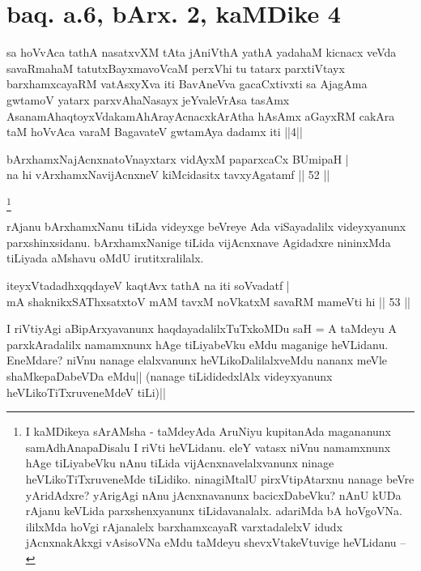 \section*{baq. a.6, bArx. 2, kaMDike 4}

\begin{shl}
sa hoVvAca tathA nasatxvXM tAta jAniVthA yathA yadahaM kicnacx veVda savaRmahaM tatutxBayxmavoVcaM perxVhi tu tatarx parxtiVtayx barxhamxcayaRM vatAsxyXva iti BavAneVva gacaCxtivxti sa AjagAma gwtamoV yatarx parxvAhaNasayx jeYvaleVrAsa tasAmx AsanamAhaqtoyxVdakamAhArayAcnacxkArAtha hAsAmx aGayxRM cakAra taM hoVvAca varaM BagavateV gwtamAya dadamx iti ||4||
\end{shl}

\begin{shl}
bArxhamxNajAcnxnatoV\s nayxtarx vidAyxM paparxcaCx BUmipaH | \\
na hi vArxhamxNavijAcnxneV kiMcidasitx tavxyA\s gatamf \hfill|| 52 || 
\end{shl}

\footnote[1]{I kaMDikeya sArAMsha - taMdeyAda AruNiyu kupitanAda 
magananunx samAdhAnapaDisalu I riVti heVLidanu. eleY vatasx niVnu 
namamxnunx hAge tiLiyabeVku nAnu tiLida vijAcnxnavelalxvanunx ninage 
heVLikoTiTxruveneMde tiLidiko. ninagiMtalU pirxVtipAtarxnu nanage 
beVre yAridAdxre? yArigAgi nAnu jAcnxnavanunx bacicxDabeVku? nAnU kUDa 
rAjanu keVLida parxshenxyanunx tiLidavanalalx. adariMda bA hoVgoVNa. 
ililxMda hoVgi rAjanalelx barxhamxcayaR varxtadalelxV idudx 
jAcnxnakAkxgi vAsisoVNa eMdu taMdeyu shevxVtakeVtuvige heVLidanu --}\stext

\begin{artha}
rAjanu bArxhamxNanu tiLida videyxge beVreye Ada viSayadalilx 
videyxyanunx parxshinxsidanu. bArxhamxNanige tiLida vijAcnxnave 
Agidadxre nininxMda tiLiyada aMshavu oMdU irutitxralilalx. 
\end{artha}

\begin{shl}
iteyxVtadadhxqqdayeV kaqtAvx tathA na iti soV\s vadatf | \\
mA shaknikxSAThxsatxtoV mAM tavxM noVkatxM savaRM mameVti hi \hfill|| 53 || 
\end{shl} 

\begin{artha}
I riVtiyAgi aBipArxyavanunx haqdayadalilxTuTxkoMDu saH = A taMdeyu A 
parxkAradalilx namamxnunx hAge tiLiyabeVku eMdu maganige heVLidanu. 
EneMdare? niVnu nanage elalxvanunx heVLikoDalilalxveMdu nananx meVle 
shaMkepaDabeVDa eMdu|| (nanage tiLididedxlAlx videyxyanunx 
heVLikoTiTxruveneMdeV tiLi)||
\end{artha}

